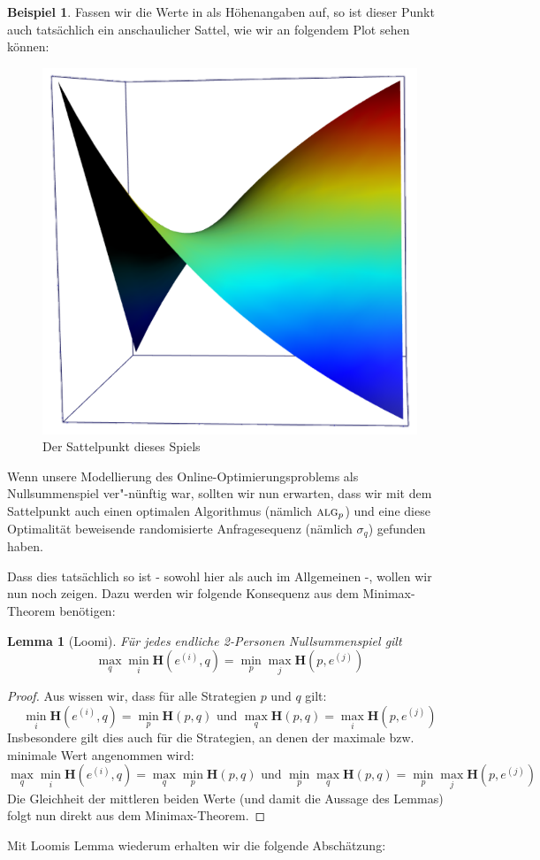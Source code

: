 \documentclass[a4paper,ngerman,12pt,bibtotoc]{scrartcl}
\theoremstyle{definition}
\newtheorem{bsp}[defn]{Beispiel}
\theoremstyle{plain}
\newtheorem{lemma}[defn]{Lemma}
\theoremstyle{remark}
\renewcommand{\_}{\mathpunct{.}\,}
\newcommand{\?}{\,{:}\,}
\newcommand{\Alg}{\ensuremath{\textsc{alg}}}
\newcommand{\EH}{\boldsymbol{H}}
\begin{document}
\begin{bsp}
		Fassen wir die Werte in  als Höhenangaben auf, so ist dieser Punkt auch tatsächlich ein \glqq anschaulicher\grqq{} Sattel, wie wir an folgendem Plot sehen können:		
		\begin{figure}[h]
			\centering
			\includegraphics[width=0.3\linewidth]{../Bilder/Rplot05}
			\caption{\small Der Sattelpunkt dieses Spiels}
			\label{fig:Rplot05}
		\end{figure} 
	\end{bsp}
	
	Wenn unsere Modellierung des Online-Optimierungsproblems als Nullsummenspiel \glqq ver"-nünftig\grqq{} war, sollten wir nun erwarten, dass wir mit dem Sattelpunkt auch einen optimalen Algorithmus (nämlich $\Alg_p$) und eine diese Optimalität beweisende randomisierte Anfragesequenz (nämlich $\sigma_q$) gefunden haben. 
	
	Dass dies tatsächlich so ist - sowohl hier als auch im Allgemeinen -, wollen wir nun noch zeigen. Dazu werden wir folgende Konsequenz aus dem Minimax-Theorem benötigen:
	
	\begin{lemma}[Loomi]\label{lemma:Loomi}
		Für jedes endliche 2-Personen Nullsummenspiel gilt
		\[\max_q\min_i\EH(e^{(i)},q) = \min_p\max_j\EH(p,e^{(j)})\]
	\end{lemma}
	
	\begin{proof}
		Aus  wissen wir, dass für alle Strategien $p$ und $q$ gilt:
			\[\min_i \EH(e^{(i)},q) = \min_p\EH(p,q) \text{ und } \max_q\EH(p,q) = \max_i \EH(p,e^{(j)})\]
		Insbesondere gilt dies auch für die Strategien, an denen der maximale bzw. minimale Wert angenommen wird:
			\[\max_q\min_i \EH(e^{(i)},q) = \max_q\min_p\EH(p,q) \text{ und } \min_p\max_q\EH(p,q) = \min_p\max_j \EH(p,e^{(j)})\]
		Die Gleichheit der mittleren beiden Werte (und damit die Aussage des Lemmas) folgt nun direkt aus dem Minimax-Theorem.
	\end{proof}
	
	Mit Loomis Lemma wiederum erhalten wir die folgende Abschätzung:
	
\end{document}
